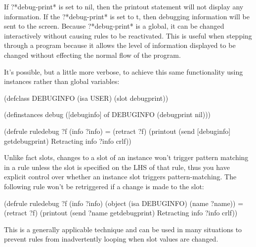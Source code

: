 \documentclass[letterpaper,10pt,english]{sphinxmanual}
\begin{document}
If ?*debug-print* is set to nil, then the printout statement will not
display any information. If the ?*debug-print* is set to t, then
debugging information will be sent to the screen. Because
?*debug-print* is a global, it can be changed interactively without
causing rules to be reactivated. This is useful when stepping through a
program because it allows the level of information displayed to be
changed without effecting the normal flow of the program.

It’s possible, but a little more verbose, to achieve this same
functionality using instances rather than global variables:

\begin{sphinxVerbatim}[commandchars=\\\{\}]
(defclass DEBUG\PYGZhy{}INFO
  (is\PYGZhy{}a USER)
  (slot debug\PYGZhy{}print))

(definstances debug
([debug\PYGZhy{}info] of DEBUG\PYGZhy{}INFO (debug\PYGZhy{}print nil)))

(defrule rule\PYGZhy{}debug
  ?f \PYGZlt{}\PYGZhy{} (info ?info)
  =\PYGZgt{}
  (retract ?f)
  (printout (send [debug\PYGZhy{}info] get\PYGZhy{}debug\PYGZhy{}print) \PYGZdq{}Retracting info \PYGZdq{} ?info
  crlf))
\end{sphinxVerbatim}

Unlike fact slots, changes to a slot of an instance won’t trigger
pattern matching in a rule unless the slot is specified on the LHS of
that rule, thus you have explicit control over whether an instance slot
triggers pattern-matching. The following rule won’t be retriggered if a
change is made to the  slot:

\begin{sphinxVerbatim}[commandchars=\\\{\}]
(defrule rule\PYGZhy{}debug
  ?f \PYGZlt{}\PYGZhy{} (info ?info)
  (object (is\PYGZhy{}a DEBUG\PYGZhy{}INFO) (name ?name))
  =\PYGZgt{}
  (retract ?f)
  (printout (send ?name get\PYGZhy{}debug\PYGZhy{}print) \PYGZdq{}Retracting info \PYGZdq{} ?info crlf))
\end{sphinxVerbatim}

This is a generally applicable technique and can be used in many
situations to prevent rules from inadvertently looping when slot values
are changed.

\label{\detokenize{defglobal:section-4}}
\end{document}
